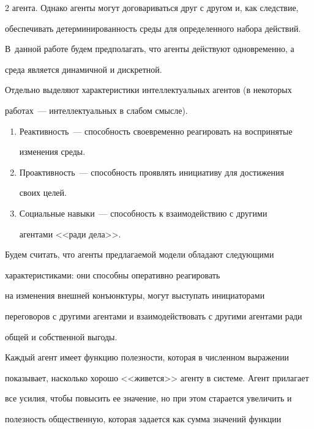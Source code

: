 \begin{multicols}{2}
агента. Однако агенты могут договариваться друг с другом и, как следствие, 


обеспечивать детерминированность среды для определенного набора действий. 


В~данной работе будем предполагать, что агенты действуют одновременно, а 


среда является динамичной и дискретной. 


  


  Отдельно выделяют характеристики интеллектуальных агентов (в некоторых 


работах~--- интеллектуальных в слабом смысле).


  \begin{enumerate}


\item Реактивность~--- способность своевременно реагировать на воспринятые 


изменения среды.


\item Проактивность~--- способность проявлять инициативу для достижения 


своих целей.


\item Социальные навыки~--- способность к взаимодействию с другими 


агентами <<ради дела>>. 


\end{enumerate}





  Будем считать, что агенты предлагаемой модели обладают сле\-ду\-ющи\-ми 


характеристиками: они способны оперативно реагировать 


на изменения внешней конъюнктуры, могут выступать инициаторами 


переговоров с другими агентами и взаимодействовать с другими агентами ради 


общей и собственной выгоды. 


  


  Каждый агент имеет функцию полезности, которая в численном выражении 


показывает, насколько хорошо <<живется>> агенту в системе. Агент прилагает 


все усилия, чтобы повысить ее значение, но при этом старается увеличить и 


полезность общественную, которая задается как сумма значений функции 



\end{multicols}
